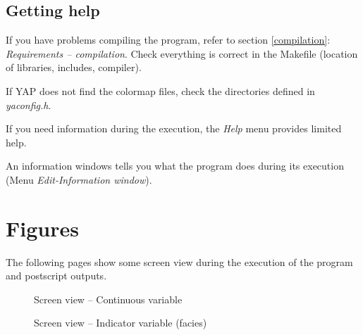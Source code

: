 \clearpage
\section{Getting help}

If you have problems compiling the program, refer to section \ref{compilation}:
{\em Requirements -- compilation}.
Check everything is correct in the Makefile (location of libraries, includes,
compiler).

If YAP does not find the colormap files, check the directories
defined in {\em yaconfig.h}.

If you need information during the execution, the {\em Help} menu provides
limited help.\\
\vspace{278pt}

\clearpage

An information windows tells you what the program does during its execution
(Menu {\em Edit-Information window}).\\
\vspace{212pt}

\clearpage
\chapter{Figures}

The following pages show some screen view during the execution of the program
and postscript outputs.

\begin{figure}[h]
\vspace{560pt}

\begin{center}
\vspace{20pt}
Screen view -- Continuous variable
\end{center}

\end{figure}

\begin{figure}[h]
\vspace{560pt}


\begin{center}
\vspace{20pt}
Screen view -- Indicator variable (facies)
\end{center}

\end{figure}


